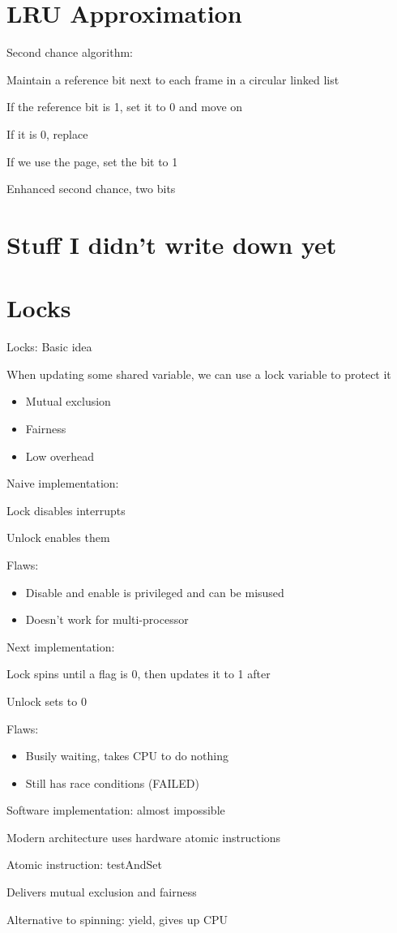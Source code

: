 \documentclass[12pt]{article}
\begin{document}
\section{LRU Approximation}

Second chance algorithm:

Maintain a reference bit next to each frame in a circular linked list

If the reference bit is 1, set it to 0 and move on

If it is 0, replace

If we use the page, set the bit to 1

Enhanced second chance, two bits

\section{Stuff I didn't write down yet}

\newpage
\section{Locks}

Locks: Basic idea

When updating some shared variable, we can use a lock variable to protect it

\begin{itemize}
    \item Mutual exclusion
    \item Fairness
    \item Low overhead
\end{itemize}

Naive implementation:

Lock disables interrupts

Unlock enables them

Flaws:
\begin{itemize}
    \item Disable and enable is privileged and can be misused
    \item Doesn't work for multi-processor
\end{itemize}

Next implementation:

Lock spins until a flag is 0, then updates it to 1 after

Unlock sets to 0

Flaws:
\begin{itemize}
    \item Busily waiting, takes CPU to do nothing
    \item Still has race conditions (FAILED)
\end{itemize}

Software implementation: almost impossible

Modern architecture uses hardware atomic instructions

Atomic instruction: testAndSet

Delivers mutual exclusion and fairness

Alternative to spinning: yield, gives up CPU
\end{document}
